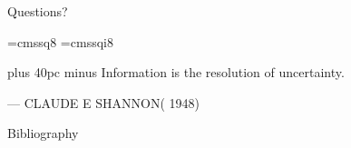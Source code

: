\documentclass[aspectratio=169]{beamer}
\begin{document}
\begin{frame}{}
      \begin{center}
    {\color{sigma@mainblue} \LARGE Questions?}
  \end{center}
\end{frame}

\font\eightss=cmssq8
\font\eightssi=cmssqi8
\newcommand\quoteAuthorDate[3]{\begingroup
  \baselineskip 10pt
  \parfillskip 0pt
  \interlinepenalty 10000 %
  \leftskip 0pt plus 40pc minus \parindent
  \let\rm=\eightss
  \let\sl=\eightssi
  \everypar{\sl}#1\par
  \nobreak\smallskip
  \noindent\rm--- #2\unskip\enspace(#3)\par
  \endgroup}
\begin{frame}
    \begin{center}
        \item \quoteAuthorDate{Information is the resolution of uncertainty.}{CLAUDE E SHANNON}{\color{sigma@mainblue} 1948}
    \end{center}
\end{frame}

\begin{frame}{Bibliography}
    
    
\end{frame}
\end{document}
